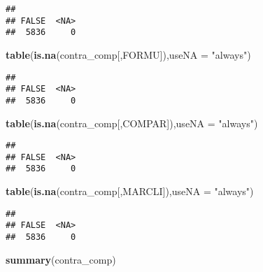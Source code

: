 \documentclass[
]{article}
\newenvironment{Shaded}{\begin{snugshade}}{\end{snugshade}}
\newcommand{\DataTypeTok}[1]{\textcolor[rgb]{0.13,0.29,0.53}{#1}}
\newcommand{\KeywordTok}[1]{\textcolor[rgb]{0.13,0.29,0.53}{\textbf{#1}}}
\newcommand{\NormalTok}[1]{#1}
\newcommand{\StringTok}[1]{\textcolor[rgb]{0.31,0.60,0.02}{#1}}
\begin{document}
\begin{verbatim}
## 
## FALSE  <NA> 
##  5836     0
\end{verbatim}

\begin{Shaded}
\begin{Highlighting}[]
\KeywordTok{table}\NormalTok{(}\KeywordTok{is.na}\NormalTok{(contra_comp[,FORMU]),}\DataTypeTok{useNA =} \StringTok{"always"}\NormalTok{)}
\end{Highlighting}
\end{Shaded}

\begin{verbatim}
## 
## FALSE  <NA> 
##  5836     0
\end{verbatim}

\begin{Shaded}
\begin{Highlighting}[]
\KeywordTok{table}\NormalTok{(}\KeywordTok{is.na}\NormalTok{(contra_comp[,COMPAR]),}\DataTypeTok{useNA =} \StringTok{"always"}\NormalTok{)}
\end{Highlighting}
\end{Shaded}

\begin{verbatim}
## 
## FALSE  <NA> 
##  5836     0
\end{verbatim}

\begin{Shaded}
\begin{Highlighting}[]
\KeywordTok{table}\NormalTok{(}\KeywordTok{is.na}\NormalTok{(contra_comp[,MARCLI]),}\DataTypeTok{useNA =} \StringTok{"always"}\NormalTok{)}
\end{Highlighting}
\end{Shaded}

\begin{verbatim}
## 
## FALSE  <NA> 
##  5836     0
\end{verbatim}

\begin{Shaded}
\begin{Highlighting}[]
\KeywordTok{summary}\NormalTok{(contra_comp)}
\end{Highlighting}
\end{Shaded}
\end{document}
